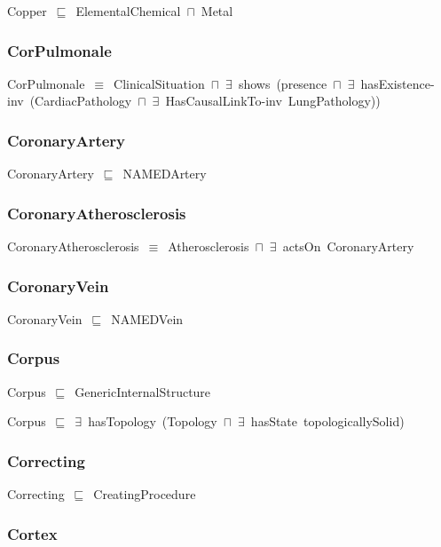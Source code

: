 \documentclass{article}
\begin{document}
Copper~\ensuremath{\sqsubseteq}~ElementalChemical~\ensuremath{\sqcap}~Metal~

\subsubsection*{CorPulmonale}

CorPulmonale~\ensuremath{\equiv}~ClinicalSituation~\ensuremath{\sqcap}~\ensuremath{\exists}~shows~(presence~\ensuremath{\sqcap}~\ensuremath{\exists}~hasExistence-inv~(CardiacPathology~\ensuremath{\sqcap}~\ensuremath{\exists}~HasCausalLinkTo-inv~LungPathology))

\subsubsection*{CoronaryArtery}

CoronaryArtery~\ensuremath{\sqsubseteq}~NAMEDArtery~

\subsubsection*{CoronaryAtherosclerosis}

CoronaryAtherosclerosis~\ensuremath{\equiv}~Atherosclerosis~\ensuremath{\sqcap}~\ensuremath{\exists}~actsOn~CoronaryArtery

\subsubsection*{CoronaryVein}

CoronaryVein~\ensuremath{\sqsubseteq}~NAMEDVein~

\subsubsection*{Corpus}

Corpus~\ensuremath{\sqsubseteq}~GenericInternalStructure~

Corpus~\ensuremath{\sqsubseteq}~\ensuremath{\exists}~hasTopology~(Topology~\ensuremath{\sqcap}~\ensuremath{\exists}~hasState~topologicallySolid)~

\subsubsection*{Correcting}

Correcting~\ensuremath{\sqsubseteq}~CreatingProcedure~

\subsubsection*{Cortex}
\end{document}
